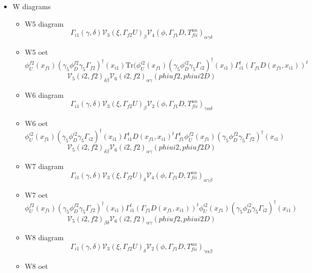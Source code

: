 \documentclass{article}[12pt]
\begin{document}
\begin{itemize}
\begin{itemize}
$$
\phi_U^{f2}(x_{f1})(\gamma_5\phi_D^{f2}\gamma_5\Gamma_{f2})^{\dagger}(x_{i2})\Gamma_{i2}U(x_{i2},x_{i1})
\mathrm{Tr}(U(x_{f1},x_{i1})\Gamma_{i1}^tD^t(x_{f1},x_{i1})\Gamma_{f1}^t)
$$
$$
\Gamma_{i1}\left(\gamma,\delta\right){\mathcal V}_3\left(\gamma_5\phi_D^{f2}\gamma_5\Gamma_{f2},\Gamma_{i2}U\right)_{\beta}
{\mathcal V}_4\left(\phi_U^{f2},\Gamma_{f1}^tU,D\right)_{\alpha\delta\gamma}
$$
\end{itemize}
\item W diagrams
\begin{itemize}
\item W5 diagram
$$
\Gamma_{i1}\left(\gamma,\delta\right){\mathcal V}_3\left(\xi,\Gamma_{f2}U\right)_{\beta}{\mathcal V}_4\left(\phi,\Gamma_{f1}D,T^{uu}_{fii}\right)_{\alpha\gamma\delta}
$$
\item W5 oet
$$
\phi_U^{f2}(x_{f1})(\gamma_5\phi_D^{f2}\gamma_5\Gamma_{f2})^{\dagger}(x_{i1})
\mathrm{Tr}(\phi_U^{i2}(x_{f1})(\gamma_5\phi_D^{i2}\gamma_5\Gamma_{i2})^{\dagger}(x_{i1})
\Gamma_{i1}^t(\Gamma_{f1}D(x_{f1},x_{i1}))^t
$$
$$
{\mathcal V}_5(i2,f2)_{\delta\beta}{\mathcal V}_6(i2,f2)_{\alpha\gamma}(phiuf2,phiui2D)
$$
\item W6 diagram
$$
\Gamma_{i1}\left(\gamma,\delta\right){\mathcal V}_3\left(\xi,\Gamma_{f2}U\right)_{\beta}{\mathcal V}_2\left(\phi,\Gamma_{f1}D,T^{uu}_{fii}\right)_{\gamma\alpha\delta}
$$
\item W6 oet
$$
\phi_U^{i2}(x_{f1})(\gamma_5\phi_D^{i2}\gamma_5\Gamma_{i2})^{\dagger}(x_{i1})\Gamma_{i1}^tD(x_{f1},x_{i1})^t
\Gamma_{f1}^t \phi_U^{f2}(x_{f1})(\gamma_5\phi_D^{f2}\gamma_5\Gamma_{f2})^{\dagger}(x_{i1})
$$
$$
{\mathcal V}_5(i2,f2)_{\delta\beta}{\mathcal V}_6(i2,f2)_{\alpha\gamma}(phiui2,phiuf2D)
$$
\item W7 diagram
$$
\Gamma_{i1}\left(\gamma,\delta\right){\mathcal V}_3\left(\xi,\Gamma_{f2}U\right)_{\delta}{\mathcal V}_4\left(\phi,\Gamma_{f1}D,T^{uu}_{fii}\right)_{\alpha\gamma\beta}
$$
\item W7 oet
$$
\phi_U^{f2}(x_{f1})(\gamma_5\phi_D^{f2}\gamma_5\Gamma_{f2})^{\dagger}(x_{i1})
\Gamma_{i1}^t(\Gamma_{f1}D(x_{f1},x_{i1}))^t\phi_U^{i2}(x_{f1})(\gamma_5\phi_D^{i2}\gamma_5\Gamma_{i2})^{\dagger}(x_{i1})
$$
$$
{\mathcal V}_5(i2,f2)_{\beta\delta}{\mathcal V}_6(i2,f2)_{\alpha\gamma}(phiuf2,phiui2D)
$$
\item W8 diagram
$$
\Gamma_{i1}\left(\gamma,\delta\right){\mathcal V}_3\left(\xi,\Gamma_{f2}U\right)_{\delta}{\mathcal V}_2\left(\phi,\Gamma_{f1}D,T^{uu}_{fii}\right)_{\gamma\alpha\beta}
$$
\item W8 oet

\end{itemize}
\end{itemize}
\end{document}
